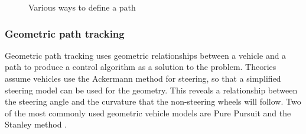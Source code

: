 \documentclass[main.tex]{subfiles}
\begin{document}
\begin{figure}[htbp]
\centering
{}\hspace{1em}%
\hspace{1em}%
\caption[Various ways to define a path]{Various ways to define a path \parencite{Giesbrecht2005}}
\end{figure}

\subsubsection{Geometric path tracking}
Geometric path tracking uses geometric relationships between a vehicle and a path to produce a control algorithm as a solution to the problem. Theories assume vehicles use the Ackermann method for steering, so that a simplified steering model can be used for the geometry. This reveals a relationship between the steering angle and the curvature that the non-steering wheels will follow. Two of the most commonly used geometric vehicle models are Pure Pursuit and the Stanley method \parencite{snider2009}.
\end{document}
